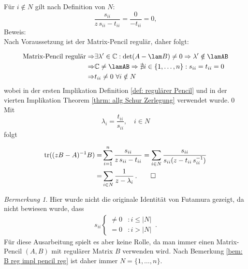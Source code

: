 \documentclass[a4paper,12pt]{report}
\newcommand{\C}{\mathbb C}
\newcommand{\tr}{\text{tr}}
\newcommand{\inv}{^{-1}}
\newcommand{\1}{\mathds{1}}
\theoremstyle{plain} %
\theoremstyle{definition} %
\theoremstyle{remark}
\newtheorem{remark}[theorem]{Bermerkung}
\begin{document}
            Für $i\notin N$ gilt nach Definition von $N$:
            $$\frac{s_{ii}}{z\,s_{ii}-t_{ii}} = \frac 0 {-t_{ii}} = 0,$$
            Beweis:\\
            Nach Voraussetzung ist der Matrix-Pencil regulär, daher folgt:

            \begin{align*}
                  \text{Matrix-Pencil regulär} \Rightarrow& \exists \lambda'\in \C: \det(A-\lam B)\ne 0 \Rightarrow \lambda'\notin \lamAB\\
                  \Rightarrow & \C \neq \lamAB \Rightarrow \nexists i\in\{1,\dots, n\}: s_{ii}=t_{ii}=0\\
                  \Rightarrow & t_{ii}\neq 0\ \forall i\notin N
            \end{align*}
            wobei in der ersten Implikation Definition \ref{def: regulärer Pencil} und in der vierten Implikation Theorem \ref{thrm: allg Schur Zerlegung} verwendet wurde.\qed \\

            Mit
            $$\lambda_i = \frac{t_{ii}}{s_{ii}},\quad i\in N$$
            folgt

            \begin{align*}
                  \tr((zB-A)\inv B) =& \sum_{i=1}^{n}\frac{s_{ii}}{z\,s_{ii}-t_{ii}} = \sum_{i\in N}\frac{s_{ii}}{s_{ii}(z-t_{ii}\, s_{ii}\inv)}\\
                  =& \sum_{i\in N} \frac{1}{z-\lambda_i}\,.\qed
            \end{align*}

            \begin{remark}
                  Hier wurde nicht die originale Identität von Futamura gezeigt, da nicht bewiesen wurde, dass
                  \begin{align*}
                        s_{ii} \begin{cases}
                              \ne 0 & : i\le |N|\\
                              = 0 & : i>|N|
                        \end{cases}\,.
                  \end{align*}
                  Für diese Ausarbeitung spielt es aber keine Rolle, da man immer einen Matrix-Pencil $(A, B)$ mit regulärer Matrix $B$ verwenden wird.
                  Nach Bemerkung \ref{bem: B reg impl pencil reg} ist daher immer $N=\{1,\dots, n\}$.
            \end{remark}
\end{document}
